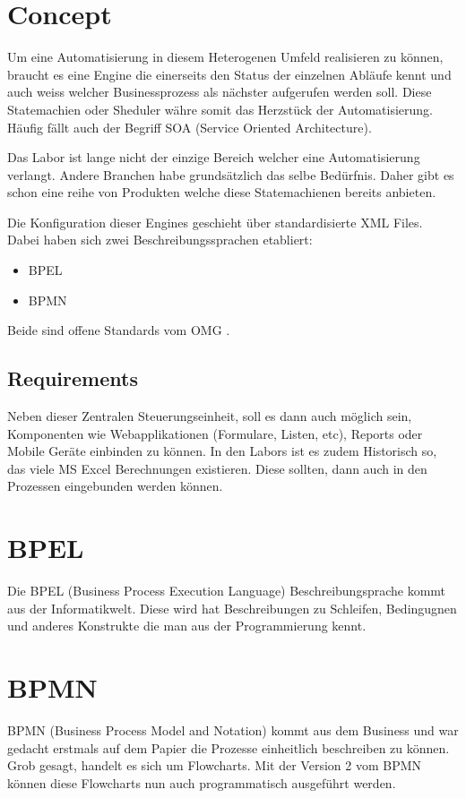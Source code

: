 \documentclass[paper=a4,twoside=false,BCOR=0mm,DIV=calc,fontsize=12pt]{scrartcl}
\begin{document}


\section{Concept}
Um eine Automatisierung in diesem Heterogenen Umfeld realisieren zu können, braucht es eine Engine die einerseits den Status der einzelnen
Abläufe kennt und auch weiss welcher Businessprozess als nächster aufgerufen werden soll. Diese Statemachien oder Sheduler währe somit das
Herzstück der Automatisierung. Häufig fällt auch der Begriff SOA (Service Oriented Architecture).

Das Labor ist lange nicht der einzige Bereich welcher eine Automatisierung verlangt. Andere Branchen habe grundsätzlich das selbe
Bedürfnis. Daher gibt es schon eine reihe von Produkten welche diese Statemachienen bereits anbieten.

Die Konfiguration dieser Engines geschieht über standardisierte XML Files. Dabei haben sich zwei Beschreibungssprachen etabliert:
\begin{itemize}
 \item BPEL
 \item BPMN
\end{itemize}

Beide sind offene Standards vom OMG \cite{omg}.


\subsection{Requirements}
Neben dieser Zentralen Steuerungseinheit, soll es dann auch möglich sein, Komponenten wie Webapplikationen (Formulare, Listen, etc),
Reports oder Mobile Geräte einbinden zu können. In den Labors ist es zudem Historisch so, das viele MS Excel Berechnungen existieren. Diese
sollten, dann auch in den Prozessen eingebunden werden können.


\section{BPEL}
Die BPEL (Business Process Execution Language) Beschreibungsprache kommt aus der Informatikwelt. Diese wird hat Beschreibungen zu
Schleifen, Bedingugnen und anderes Konstrukte die man aus der Programmierung kennt. 


\section{BPMN}
BPMN (Business Process Model and Notation) kommt aus dem Business und war gedacht erstmals auf dem Papier die Prozesse einheitlich
beschreiben zu können. Grob gesagt, handelt es sich um Flowcharts. 
Mit der Version 2 vom BPMN können diese Flowcharts nun auch programmatisch ausgeführt werden. 
\end{document}
